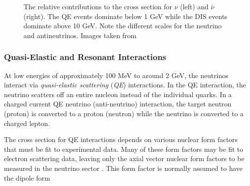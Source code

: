 \begin{figure}[!h]%
        \centering
\caption{The relative contributions to the cross section for $\nu$ (left) and $\bar{\nu}$ (right). The QE events dominate below 1 GeV while the DIS events dominate above 10 GeV. Note the different scales for the neutrino and antineutrinos. Images taken from \cite{Formaggio-Xsec}}
\label{fig:xsec}
\end{figure}

\subsubsection{Quasi-Elastic and Resonant Interactions}
At low energies of approximately 100 MeV to around 2 GeV, the neutrinos interact via \emph{quasi-elastic scattering} (\emph{QE}) interactions.
In the QE interaction, the neutrino scatters off an entire nucleon instead of the individual quarks.
In a charged current QE neutrino (anti-neutrino) interaction, the target neutron (proton) is converted to a proton (neutron) while the neutrino is converted to a charged lepton.

The cross section for QE interactions depends on various nuclear form factors that must be fit to experimental data.
Many of these form factors may be fit to electron scattering data, leaving only the axial vector nuclear form factors to be measured in the neutrino sector \cite{Formaggio-Xsec}.
This form factor is normally assumed to have the dipole form 

